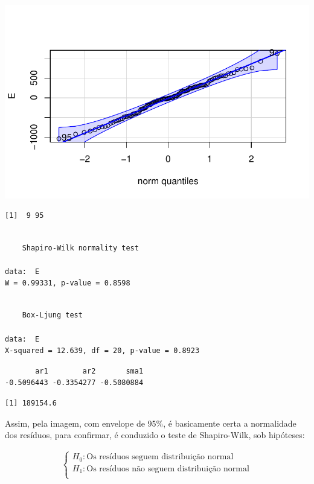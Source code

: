 \documentclass[
  letterpaper,
  DIV=11,
  numbers=noendperiod]{scrartcl}
\begin{document}
\includegraphics{T2_grupo10_files/figure-pdf/unnamed-chunk-2-2.pdf}

\begin{verbatim}
[1]  9 95
\end{verbatim}

\begin{verbatim}

    Shapiro-Wilk normality test

data:  E
W = 0.99331, p-value = 0.8598
\end{verbatim}

\begin{verbatim}

    Box-Ljung test

data:  E
X-squared = 12.639, df = 20, p-value = 0.8923
\end{verbatim}

\begin{verbatim}
       ar1        ar2       sma1 
-0.5096443 -0.3354277 -0.5080884 
\end{verbatim}

\begin{verbatim}
[1] 189154.6
\end{verbatim}

Assim, pela imagem, com envelope de 95\%, é basicamente certa a
normalidade dos resíduos, para confirmar, é conduzido o teste de
Shapiro-Wilk, sob hipóteses:

\begin{align}
  \begin{cases}
    H_0:\text{Os resíduos seguem distribuição normal}\\
    H_1: \text{Os resíduos não seguem distribuição normal}\\
  \end{cases}
\end{align}
\end{document}
